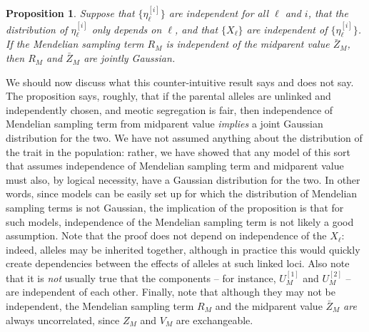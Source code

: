 \documentclass{article}
\newcommand{\1}{\mathbbm{1}}
\newtheorem{prop}{Proposition}
\theoremstyle{remark}
\theoremstyle{definition}
\begin{document}
\begin{prop}\label{prop:parental_contribs}
    Suppose that $\{\eta_\ell^{[i]}\}$ are independent for all $\ell$ and $i$,
    that the distribution of $\eta_\ell^{[i]}$ only depends on $\ell$,
    and that $\{X_\ell\}$ are independent of $\{\eta_\ell^{[i]}\}$.
    If the Mendelian sampling term $R_M$ is independent of the midparent value $\bar Z_M$,
    then $R_M$ and $\bar Z_M$ are jointly Gaussian.
\end{prop}

We should now discuss what this counter-intuitive result says and does not say.
The proposition says, roughly, that if the parental alleles are unlinked and independently chosen,
and meotic segregation is fair,
then independence of Mendelian sampling term from midparent value
\emph{implies} a joint Gaussian distribution for the two.
We have not assumed anything about the distribution of the trait in the population:
rather, we have showed that any model of this sort
that assumes independence of Mendelian sampling term and midparent value
must also, by logical necessity, have a Gaussian distribution for the two.
In other words,
since models can be easily set up for which the distribution of Mendelian sampling terms
is not Gaussian,
the implication of the proposition
is that for such models, independence of the Mendelian sampling term
is not likely a good assumption. 
Note that the proof does not depend on independence of the $X_\ell$:
indeed, alleles may be inherited together,
although in practice this would quickly create dependencies between the effects
of alleles at such linked loci. 
Also note that it is \emph{not} usually true that the components --
for instance, $U_M^{[1]}$ and $U_M^{[2]}$ --
are independent of each other.
Finally, note that although they may not be independent,
the Mendelian sampling term $R_M$ and the midparent value $\bar Z_M$
\emph{are} always uncorrelated, since $Z_M$ and $V_M$ are exchangeable.
\end{document}
